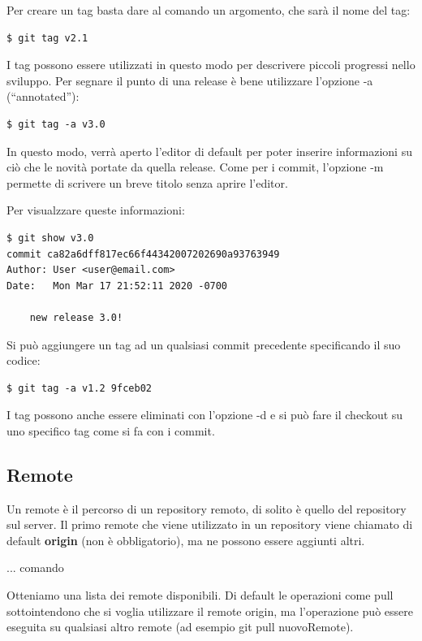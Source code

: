 \documentclass{article} \usepackage[textwidth=18cm,textheight=18cm]{geometry}
\begin{document}
Per creare un tag basta dare al comando un argomento, che sarà il nome del tag:

\begin{verbatim}
$ git tag v2.1
\end{verbatim}

I tag possono essere utilizzati in questo modo per descrivere piccoli progressi
nello sviluppo. Per segnare il punto di una release è bene utilizzare l'opzione
-a (``annotated''): 

\begin{verbatim}
$ git tag -a v3.0
\end{verbatim}

In questo modo, verrà aperto l'editor di default per poter inserire informazioni
su ciò che le novità portate da quella release. Come per i commit, l'opzione -m
permette di scrivere un breve titolo senza aprire l'editor.

Per visualzzare queste informazioni:

\begin{verbatim}
$ git show v3.0
commit ca82a6dff817ec66f44342007202690a93763949
Author: User <user@email.com>
Date:   Mon Mar 17 21:52:11 2020 -0700

    new release 3.0!
\end{verbatim}

Si può aggiungere un tag ad un qualsiasi commit precedente specificando il suo
codice:

\begin{verbatim}
$ git tag -a v1.2 9fceb02
\end{verbatim}

I tag possono anche essere eliminati con l'opzione -d e si può fare il checkout
su uno specifico tag come si fa con i commit.

\subsection{Remote\label{remoti}}

Un remote è il percorso di un repository remoto, di solito è quello del
repository sul server. Il primo remote che viene utilizzato in un repository
viene chiamato di default \textbf{origin} (non è obbligatorio), ma ne possono
essere aggiunti altri.

... comando

Otteniamo una lista dei remote disponibili. Di default le operazioni come pull
sottointendono che si voglia utilizzare il remote origin, ma l'operazione può
essere eseguita su qualsiasi altro remote (ad esempio git pull nuovoRemote).
\end{document}
